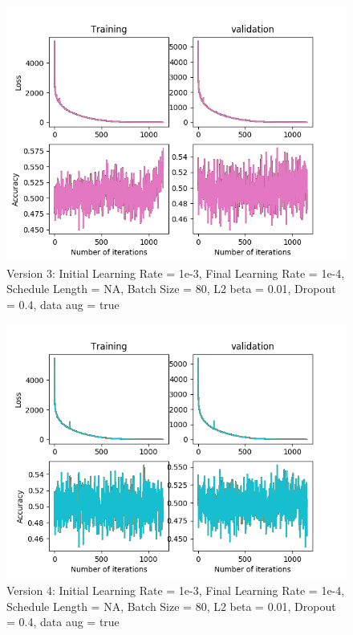 \documentclass[12pt,reqno]{amsart}
\numberwithin{equation}{section}
\begin{document}
\begin{enumerate}
\begin{figure}[H]
\centering
\includegraphics[scale=0.6]{data12_version3_step0}
\caption{Version 3: Initial Learning Rate = 1e-3, Final Learning Rate = 1e-4, Schedule Length = NA, Batch Size = 80, L2 beta = 0.01, Dropout = 0.4, data aug = true}
\end{figure}

\begin{figure}[H]
\centering
\includegraphics[scale=0.6]{data12_version4_step0}
\caption{Version 4: Initial Learning Rate = 1e-3, Final Learning Rate = 1e-4, Schedule Length = NA, Batch Size = 80, L2 beta = 0.01, Dropout = 0.4, data aug = true}
\end{figure}


\end{enumerate}
\end{document}
